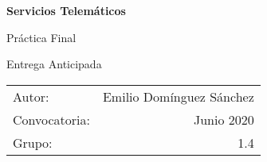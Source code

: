 \begin{titlepage}
    \begin{center}
        \vspace*{1cm}
        
        \Huge \textbf{Servicios Telemáticos}
        
        \vspace{0.5cm}
        \LARGE Práctica Final
        
        \vspace{0.5cm}
        
        \Large Entrega Anticipada
        
        \vspace{0.5cm}
   		
        \vfill
        
        \vspace{0.8cm}
        \Large
            \begin{flushright}
              	\begin{tabular}{lr}
                  Autor:        & Emilio Domínguez Sánchez\\
                  Convocatoria: & Junio 2020\\
                  Grupo:        & 1.4 \\
                \end{tabular}
            \end{flushright}
        \vspace{0.5cm}
        
    \end{center}
\end{titlepage}
